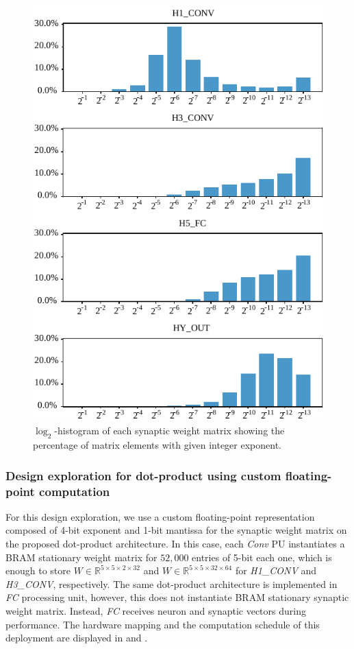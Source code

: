 \begin{figure}[h!]
	\includegraphics[width=\columnwidth]{../figures/log2_histogram.pdf}
	\caption{$\log_2$-histogram of each synaptic weight matrix showing the percentage of matrix elements with given integer exponent.}\label{fig:log2histogram}
\end{figure}

\subsubsection{Design exploration for dot-product using custom floating-point computation}
For this design exploration, we use a custom floating-point representation composed of 4-bit exponent and 1-bit mantissa for the synaptic weight matrix on the proposed dot-product architecture. In this case, each \emph{Conv} PU instantiates a BRAM stationary weight matrix for $52,000$ entries of 5-bit each one, which is enough to store $W\in\mathbb{R}^{5\times 5\times 2\times 32}$ and $W\in\mathbb{R}^{5\times 5\times 32\times 64}$ for \emph{H1\_CONV} and \emph{H3\_CONV}, respectively. The same dot-product architecture is implemented in \emph{FC} processing unit, however, this does not instantiate BRAM stationary synaptic weight matrix. Instead, \emph{FC} receives neuron and synaptic vectors during performance. The hardware mapping and the computation schedule of this deployment are displayed in  and .

